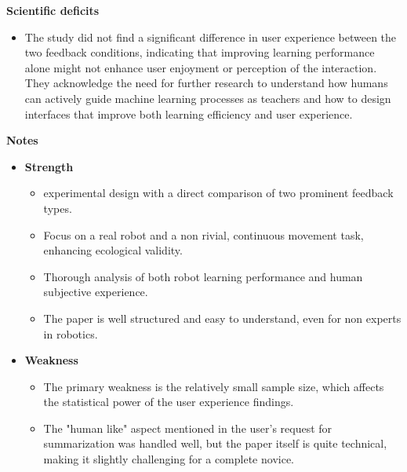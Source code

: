 \documentclass[report.tex]{subfiles}
\begin{document}
\noindent\textbf{Scientific deficits} 
\begin{itemize}
        \item The study did not find a significant difference in user experience between the two feedback
conditions, indicating that improving learning performance alone might not enhance user
enjoyment or perception of the interaction.
         They acknowledge the need for further research to understand how humans can actively
guide machine learning processes as teachers and how to design interfaces that improve both
learning efficiency and user experience.
        
\end{itemize}

\noindent\textbf{Notes}
\begin{itemize}
    \item \noindent\textbf {Strength}
    \begin{itemize}
        \item experimental design with a direct comparison of two prominent feedback types.
        \item Focus on a real robot and a non rivial, continuous movement task, enhancing ecological
validity.
        \item Thorough analysis of both robot learning performance and human subjective experience.
        \item The paper is well structured and easy to understand, even for non experts in robotics.
    \end{itemize}
    
    \item \noindent\textbf{Weakness}
    \begin{itemize}
        \item The primary weakness is the relatively small sample size, which affects the statistical power
of the user experience findings.
        \item The "human like" aspect mentioned in the user's request for summarization was handled
well, but the paper itself is quite technical, making it slightly challenging for a complete
novice.
       
    \end{itemize}
\end{itemize}
\end{document}
